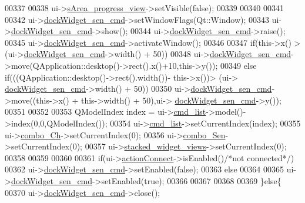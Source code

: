\begin{DoxyCode}
00337 
00338         ui->\hyperlink{a00080_ae4fe44aa026dd0e84e0f10cdcabca504}{sArea\_progress\_view}->setVisible(\textcolor{keyword}{false});
00339 
00340 
00341 
00342         ui->\hyperlink{a00080_a9eb86a5ee396766f0f4a65f2d2bd7688}{dockWidget\_sen\_cmd}->setWindowFlags(Qt::Window);
00343         ui->\hyperlink{a00080_a9eb86a5ee396766f0f4a65f2d2bd7688}{dockWidget\_sen\_cmd}->show();
00344         ui->\hyperlink{a00080_a9eb86a5ee396766f0f4a65f2d2bd7688}{dockWidget\_sen\_cmd}->raise();
00345         ui->\hyperlink{a00080_a9eb86a5ee396766f0f4a65f2d2bd7688}{dockWidget\_sen\_cmd}->activateWindow();
00346 
00347         \textcolor{keywordflow}{if}(this->x() > (ui->\hyperlink{a00080_a9eb86a5ee396766f0f4a65f2d2bd7688}{dockWidget\_sen\_cmd}->width() + 50))
00348         ui->\hyperlink{a00080_a9eb86a5ee396766f0f4a65f2d2bd7688}{dockWidget\_sen\_cmd}->move(QApplication::desktop()->rect().x()+10,this->y());
00349         \textcolor{keywordflow}{else} \textcolor{keywordflow}{if}(((QApplication::desktop()->rect().width())- this->x())> (ui->
      \hyperlink{a00080_a9eb86a5ee396766f0f4a65f2d2bd7688}{dockWidget\_sen\_cmd}->width() + 50))
00350         ui->\hyperlink{a00080_a9eb86a5ee396766f0f4a65f2d2bd7688}{dockWidget\_sen\_cmd}->move((this->x() + this->width() + 50),ui->
      \hyperlink{a00080_a9eb86a5ee396766f0f4a65f2d2bd7688}{dockWidget\_sen\_cmd}->y());
00351 
00352 
00353         QModelIndex index = ui->\hyperlink{a00080_aa66ece71395b435e915d384fb63bac1d}{cmd\_list}->model()->index(0,0,QModelIndex());
00354         ui->\hyperlink{a00080_aa66ece71395b435e915d384fb63bac1d}{cmd\_list}->setCurrentIndex(index);
00355         ui->\hyperlink{a00080_a263fb43f2eff37a44ff7359ba41e2eeb}{combo\_Ch}->setCurrentIndex(0);
00356         ui->\hyperlink{a00080_ad95005b5fcac8126171019298147b285}{combo\_Sen}->setCurrentIndex(0);
00357         ui->\hyperlink{a00080_a59e39bd3d716004e840a5be5dda18b96}{stacked\_widget\_views}->setCurrentIndex(0);
00358 
00359 
00360 
00361         \textcolor{keywordflow}{if}(ui->\hyperlink{a00080_aa0785566311fc48271690fb68b1d4c5f}{actionConnect}->isEnabled()\textcolor{comment}{/*not connected*/})
00362           ui->\hyperlink{a00080_a9eb86a5ee396766f0f4a65f2d2bd7688}{dockWidget\_sen\_cmd}->setEnabled(\textcolor{keyword}{false});
00363         \textcolor{keywordflow}{else}
00364 
00365             ui->\hyperlink{a00080_a9eb86a5ee396766f0f4a65f2d2bd7688}{dockWidget\_sen\_cmd}->setEnabled(\textcolor{keyword}{true});
00366 
00367 
00368 
00369     \}\textcolor{keywordflow}{else}\{
00370         ui->\hyperlink{a00080_a9eb86a5ee396766f0f4a65f2d2bd7688}{dockWidget\_sen\_cmd}->close();

\end{DoxyCode}
